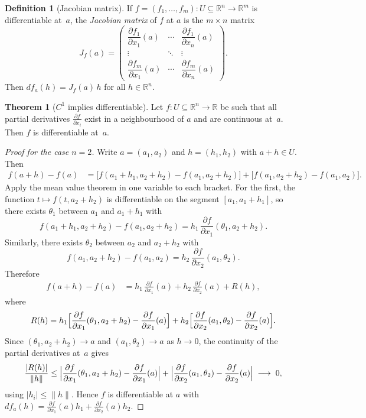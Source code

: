 \documentclass[12pt,a4paper]{book}
\theoremstyle{definition}
\newtheorem{definition}{Definition}[chapter]
\newtheorem{theorem}{Theorem}[chapter]
\begin{document}
\begin{definition}[Jacobian matrix]\label{def:jacobian}
If $f=(f_1,\dots,f_m)\colon U\subseteq\mathbb{R}^n\to\mathbb{R}^m$ is
differentiable at~$a$, the \emph{Jacobian matrix} of $f$ at $a$ is the
$m\times n$ matrix
\[
  J_f(a) = \begin{pmatrix}
    \dfrac{\partial f_1}{\partial x_1}(a) & \cdots &
    \dfrac{\partial f_1}{\partial x_n}(a) \\[8pt]
    \vdots & \ddots & \vdots \\[4pt]
    \dfrac{\partial f_m}{\partial x_1}(a) & \cdots &
    \dfrac{\partial f_m}{\partial x_n}(a)
  \end{pmatrix}.
\]
Then $df_a(h)=J_f(a)\,h$ for all $h\in\mathbb{R}^n$.
\end{definition}

\begin{theorem}[$C^1$ implies differentiable]
\label{thm:C1-implies-diff}
Let $f\colon U\subseteq\mathbb{R}^n\to\mathbb{R}$ be such that all partial
derivatives $\frac{\partial f}{\partial x_i}$ exist in a neighbourhood of
$a$ and are continuous at~$a$.  Then $f$ is differentiable at~$a$.
\end{theorem}

\begin{proof}[Proof for the case $n=2$]
Write $a=(a_1,a_2)$ and $h=(h_1,h_2)$ with $a+h\in U$.  Then
\begin{align*}
  f(a+h)-f(a)
  &= \bigl[f(a_1+h_1,a_2+h_2)-f(a_1,a_2+h_2)\bigr]
     +\bigl[f(a_1,a_2+h_2)-f(a_1,a_2)\bigr].
\end{align*}
Apply the mean value theorem in one variable to each bracket.  For the first,
the function $t\mapsto f(t,a_2+h_2)$ is differentiable on the segment
$[a_1,a_1+h_1]$, so there exists $\theta_1$ between $a_1$ and $a_1+h_1$
with
\[
  f(a_1+h_1,a_2+h_2)-f(a_1,a_2+h_2)
  = h_1\,\frac{\partial f}{\partial x_1}(\theta_1,a_2+h_2).
\]
Similarly, there exists $\theta_2$ between $a_2$ and $a_2+h_2$ with
\[
  f(a_1,a_2+h_2)-f(a_1,a_2)
  = h_2\,\frac{\partial f}{\partial x_2}(a_1,\theta_2).
\]
Therefore
\begin{align*}
  f(a+h)-f(a)
  &= h_1\,\frac{\partial f}{\partial x_1}(a)
    +h_2\,\frac{\partial f}{\partial x_2}(a) + R(h),
\end{align*}
where
\[
  R(h) = h_1\Bigl[\frac{\partial f}{\partial x_1}(\theta_1,a_2+h_2)
         -\frac{\partial f}{\partial x_1}(a)\Bigr]
        +h_2\Bigl[\frac{\partial f}{\partial x_2}(a_1,\theta_2)
         -\frac{\partial f}{\partial x_2}(a)\Bigr].
\]
Since $(\theta_1,a_2+h_2)\to a$ and $(a_1,\theta_2)\to a$ as $h\to 0$,
the continuity of the partial derivatives at~$a$ gives
\[
  \frac{|R(h)|}{\|h\|}
  \le \Bigl|\frac{\partial f}{\partial x_1}(\theta_1,a_2+h_2)
      -\frac{\partial f}{\partial x_1}(a)\Bigr|
     +\Bigl|\frac{\partial f}{\partial x_2}(a_1,\theta_2)
      -\frac{\partial f}{\partial x_2}(a)\Bigr|
  \;\longrightarrow\; 0,
\]
using $|h_i|\le\|h\|$.  Hence $f$ is differentiable at $a$ with
$df_a(h)=\frac{\partial f}{\partial x_1}(a)h_1
+\frac{\partial f}{\partial x_2}(a)h_2$.
\end{proof}
\end{document}
